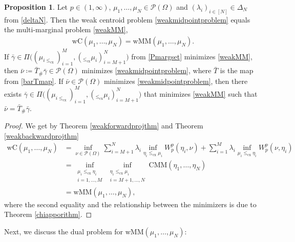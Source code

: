 \documentclass[letterpaper]{amsart}
\theoremstyle{definition}
\newtheorem{prop}[thm]{Proposition}
\begin{document}
\begin{prop}\label{midpoint=MMprop}
	Let $p\in(1,\infty)$, $\mu_1,\dots,\mu_N\in\mathcal P(\Omega)$ and $(\lambda_i)_{i\in[N]}\in\Delta_N$ from \eqref{deltaN}. Then the weak centroid problem \eqref{weakmidpointproblem} equals the multi-marginal problem \eqref{weakMM},
	\begin{gather*}
			\text{wC}(\mu_1,\dots,\mu_N)=\text{wMM}(\mu_1,\dots,\mu_N).
	\end{gather*}
	If $\bar\gamma\in\Pi\big((\mu_{i\leq_{\text{cx}}})_{i=1}^M,(_{\leq_{\text{cx}}}\mu_i)_{i=M+1}^N\big)$ from \eqref{Pmargset} minimizes \eqref{weakMM}, then $\bar\nu\coloneqq\bar T_{\#}\bar\gamma\in\mathcal P(\Omega)$ minimizes \eqref{weakmidpointproblem}, where $\bar T$ is the map from \eqref{barTmap}. If $\bar\nu\in\mathcal P(\Omega)$ minimizes \eqref{weakmidpointproblem}, then there exists $\bar\gamma\in\Pi\big((\mu_{i\leq_{\text{cx}}})_{i=1}^M,(_{\leq_{\text{cx}}}\mu_i)_{i=M+1}^N\big)$ that minimizes \eqref{weakMM} such that $\bar\nu=\bar T_{\#}\bar\gamma$.
\end{prop}
\begin{proof}
	We get by Theorem \ref{weakforwardprojthm} and Theorem \ref{weakbackwardprojthm}
	\begin{align*}
		\text{wC}(\mu_1,\dots,\mu_N)
		&=\inf_{\nu\in\mathcal P(\Omega)}\sum_{i=M+1}^N\mathcal \lambda_i \inf_{\eta_i\leq_{\text{cx}}\mu_i}W_p^p(\eta_i,\nu)+\sum_{i=1}^M\lambda_i\inf_{\mu_i\leq_{\text{cx}}\eta_i}W_p^p(\nu,\eta_i)\\
		&=\inf_{\substack{\mu_i\leq_{\text{cx}}\eta_i\\ i=1,\dots,M}}\inf_{\substack{\eta_i\leq_{\text{cx}}\mu_i\\ i=M+1,\dots,N}}\text{CMM}(\eta_1,\dots,\eta_N)\\
		&=\text{wMM}(\mu_1,\dots,\mu_N),
	\end{align*}
	where the second equality and the relationship between the minimizers is due to Theorem \ref{chiapporithm}.
\end{proof}
Next, we discuss the dual problem for $\text{wMM}(\mu_1,\dots,\mu_N)$:
\end{document}
